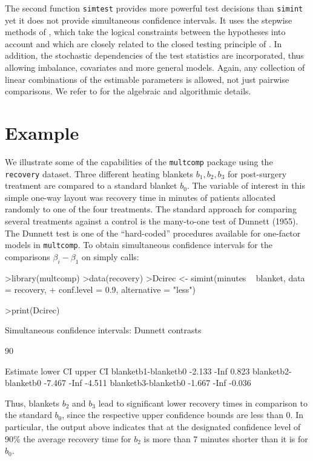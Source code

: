 \documentclass{article}
\begin{document}
The second function \texttt{simtest} provides more powerful test
decisions than \texttt{simint} yet it does not provide
simultaneous confidence intervals. It uses the stepwise methods of
\cite{westfall:1997}, which take the logical constraints between the
hypotheses into account and which are closely related to the
closed testing principle of \cite{Marcusetal:1976}. In addition, the
stochastic dependencies of the test statistics are incorporated,
thus allowing imbalance, covariates and more general models.
Again, any collection of linear combinations of the estimable
parameters is allowed, not just pairwise comparisons. We refer to
\cite{westfall:1997} for the algebraic and algorithmic details.

\section{Example}

We illustrate some of the capabilities of the \texttt{multcomp}
package using the \texttt{recovery} dataset. Three
different heating blankets $b_1, b_2, b_3$ for post-surgery
treatment are compared to a standard blanket $b_0$. The variable
of interest in this simple one-way layout was recovery time in
minutes of patients allocated randomly to one of the four
treatments. The standard approach for comparing several treatments
against a control is the many-to-one test of Dunnett (1955). The
Dunnett test is one of the ``hard-coded'' procedures available for
one-factor models in \texttt{multcomp}. To obtain simultaneous
confidence intervals for the comparisons $\beta_i - \beta_1$ on
simply calls:
\small
\begin{Schunk}
\begin{Sinput}
>library(multcomp)
>data(recovery)
>Dcirec <- simint(minutes ~ blanket, data = recovery, 
+     conf.level = 0.9, alternative = "less")
\end{Sinput}
\end{Schunk}
\begin{Schunk}
\begin{Sinput}
>print(Dcirec)
\end{Sinput}
\begin{Soutput}
	Simultaneous confidence intervals: Dunnett
	contrasts

	90 % confidence intervals

                    Estimate lower CI upper CI
blanketb1-blanketb0   -2.133     -Inf    0.823
blanketb2-blanketb0   -7.467     -Inf   -4.511
blanketb3-blanketb0   -1.667     -Inf   -0.036
\end{Soutput}
\end{Schunk}
\normalsize
Thus, blankets $b_2$ and $b_3$ lead to significant lower recovery
times in comparison to the standard $b_0$, since the respective
upper confidence bounds are less than 0. In particular, the output
above indicates that at the designated confidence level of 90\%
the average recovery time for $b_2$ is more than 7 minutes shorter
than it is for $b_0$.
\end{document}
